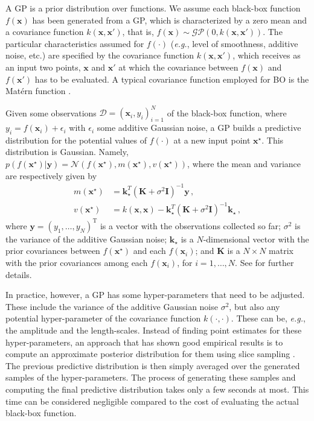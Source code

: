 \documentclass[review,preprint,12pt]{elsarticle}
\begin{document}
A GP is a prior distribution over functions. We assume each black-box function 
$f(\mathbf{x})$ has been generated from a GP, which is characterized by a zero 
mean and a covariance function $k(\mathbf{x},\mathbf{x}')$, 
that is, $f(\mathbf{x}) \sim \mathcal{G}\mathcal{P}(0,k(\mathbf{x},\mathbf{x}'))$. 
The particular characteristics assumed for $f(\cdot)$ (\emph{e.g.}, level of smoothness, additive noise, 
etc.) are specified by the covariance function $k(\mathbf{x},\mathbf{x}')$, 
which receives as an input two points, $\mathbf{x}$ and $\mathbf{x}'$ 
at which the covariance between $f(\mathbf{x})$ and $f(\mathbf{x}')$ has to be evaluated. 
A typical covariance function employed for BO is the Mat\'ern function \citep{snoek2012practical}. 

Given some observations $\mathcal{D} = {(\mathbf{x}_i,y_i)}_{i=1}^N$
of the black-box function, where $y_i=f(\mathbf{x}_i) + \epsilon_i$ with $\epsilon_i$ some 
additive Gaussian noise, a GP builds a predictive distribution for the potential values of 
$f(\cdot)$ at a new input point $\mathbf{x}^\star$. This distribution is Gaussian. Namely,
$p(f(\mathbf{x}^\star)|\mathbf{y}) =\mathcal{N}(f(\mathbf{x}^\star),
m(\mathbf{x}^\star),  v(\mathbf{x}^\star))$, where the mean and variance are respectively given by
\begin{align}
m(\mathbf{x}^\star) & = \mathbf{k}_{\star}^{T} (\mathbf{K}+\sigma^{2}\mathbf{I})^{-1}\mathbf{y}\,, \\
v(\mathbf{x}^\star) & = k(\mathbf{x},\mathbf{x}) - \mathbf{k}_{\star}^T(\mathbf{K}+\sigma^{2} \mathbf{I})^{-1}\mathbf{k}_\star\,,
\end{align}
where $\mathbf{y}=(y_1,\ldots,y_N)^\text{T}$ is a vector with the observations collected so far; 
$\sigma^2$ is the variance of the additive Gaussian noise;
$\mathbf{k}_\star$ is a $N$-dimensional vector with the prior covariances between $f(\mathbf{x}^\star)$ and 
each $f(\mathbf{x}_i)$; and $\mathbf{K}$ is a $N\times N$ matrix with the prior covariances 
among each $f(\mathbf{x}_i)$, for $i=1,\ldots,N$. 
See \citep{rasmussen2006gaussian} for further details.

In practice, however, a GP has some hyper-parameters that need to be adjusted. These include the variance
of the additive Gaussian noise $\sigma^2$, but also any potential hyper-parameter of the covariance 
function $k(\cdot,\cdot)$. These can be, \emph{e.g.}, the amplitude and the length-scales. 
Instead of finding point estimates for these hyper-parameters, an
approach that has shown good empirical results is to compute an approximate posterior 
distribution for them using slice sampling \citep{snoek2012practical}. The previous predictive distribution 
is then simply averaged over the generated samples of the hyper-parameters. The process of generating these 
samples and computing the final predictive distribution takes only a few seconds at most. This time can be 
considered negligible compared to the cost of evaluating the actual black-box function.
\end{document}
